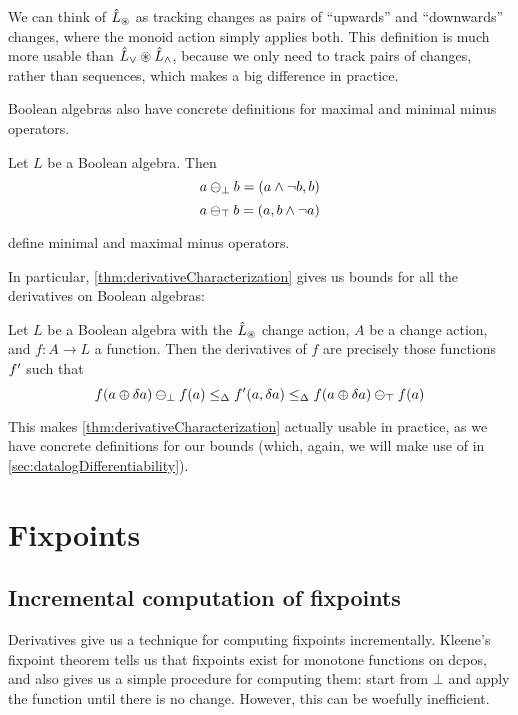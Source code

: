 We can think of $\hat{L}_\circledast$ as tracking changes as pairs of ``upwards'' and
``downwards'' changes, where the monoid action simply applies both. This
definition is much more usable than $\hat{L}_\vee \circledast \hat{L}_\wedge$, because we
only need to track pairs of changes, rather than sequences, which makes a big
difference in practice.

Boolean algebras also have concrete definitions for maximal and minimal minus
operators.

\begin{prop}
  Let $L$ be a Boolean algebra. Then
  $$a \ominus_\bot b = (a \wedge \neg b, b)$$
  $$a \ominus_\top b = (a, b \wedge \neg a)$$

  define minimal and maximal minus operators.
\end{prop}

In particular, \cref{thm:derivativeCharacterization} gives us bounds for
all the derivatives on Boolean algebras:

\begin{corollary}
\label{cor:booleanCharacterization}
  Let $L$ be a Boolean algebra with the $\hat{L}_\circledast$ change action, $A$ be
  a change action, and $f: A \rightarrow
  L$ a function. Then the derivatives of $f$ are precisely those functions
  $f'$ such that
  $$
  f(a \oplus \delta a) \ominus_\bot f(a)
  \leq_\Delta
  f'(a, \delta a)
  \leq_\Delta
  f(a \oplus \delta a) \ominus_\top f(a)
  $$
\end{corollary}

This makes \cref{thm:derivativeCharacterization} actually usable in practice, as
we have concrete definitions for our bounds (which, again, we will make use of in \cref{sec:datalogDifferentiability}).

\section{Fixpoints}
\label{sec:fixpoints}

\subsection{Incremental computation of fixpoints}

Derivatives give us a technique for computing fixpoints incrementally. Kleene's
fixpoint theorem tells us that fixpoints exist for monotone functions on dcpos, and also gives us
a simple procedure for computing them: start from $\bot$ and apply the function
until there is no change. However, this can be woefully inefficient.

